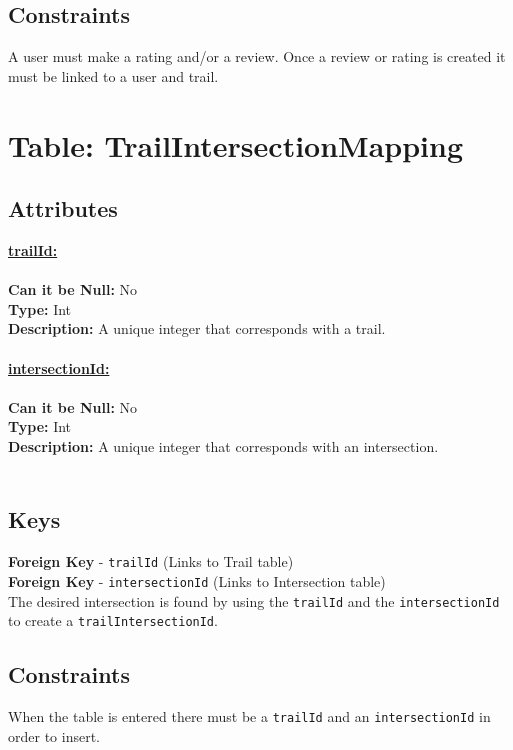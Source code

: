 \subsection{Constraints} 
A user must make a rating and/or a review.
Once a review or rating is created it must be linked to a user and trail.




\newpage
\section{Table: TrailIntersectionMapping}
\subsection{Attributes}
\textbf{\underline{trailId:}}\\
\\
\textbf{Can it be Null:} No \\
\textbf{Type:} Int \\
\textbf{Description:} A unique integer that corresponds with a trail. \\\\
\textbf{\underline{intersectionId:}}\\
\\
\textbf{Can it be Null:} No \\
\textbf{Type:} Int \\
\textbf{Description:} A unique integer that corresponds with an intersection. \\\\

\subsection{Keys}
\textbf{Foreign Key} - \texttt{trailId} (Links to Trail table)\\
\textbf{Foreign Key} - \texttt{intersectionId} (Links to Intersection table)\\
The desired intersection is found by using the \texttt{trailId} and the \texttt{intersectionId} to create a 
\texttt{trailIntersectionId}.

\subsection{Constraints} 
When the table is entered there must be a \texttt{trailId} and an \texttt{intersectionId} in 
order to insert. 












